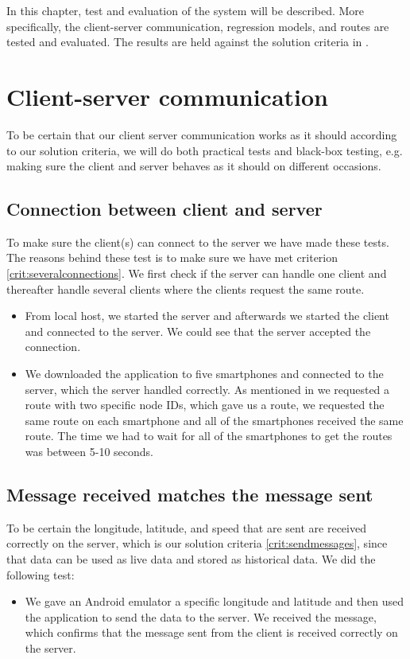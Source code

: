 In this chapter, test and evaluation of the system will be described. More specifically, the client-server communication, regression models, and routes are tested and evaluated. The results are held against the solution criteria in .

\section{Client-server communication}
To be certain that our client server communication works as it should according to our solution criteria, we will do both practical tests and black-box testing, e.g. making sure the client and server behaves as it should on different occasions.

\subsection{Connection between client and server}
To make sure the client(s) can connect to the server we have made these tests. The reasons behind these test is to make sure we have met criterion \ref{crit:severalconnections}. We first check if the server can handle one client and thereafter handle several clients where the clients request the same route. 
\begin{itemize}
	\item From local host, we started the server and afterwards we started the client and connected to the server. We could see that the server accepted the connection.
	\item We downloaded the application to five smartphones and connected to the server, which the server handled correctly. As mentioned in  we requested a route with two specific node IDs, which gave us a route, we requested the same route on each smartphone and all of the smartphones received the same route. The time we had to wait for all of the smartphones to get the routes was between 5-10 seconds.
\end{itemize}

\subsection{Message received matches the message sent}
To be certain the longitude, latitude, and speed that are sent are received correctly on the server, which is our solution criteria \ref{crit:sendmessages}, since that data can be used as live data and stored as historical data. We did the following test:
\begin{itemize}
	\item We gave an Android emulator a specific longitude and latitude and then used the application to send the data to the server. We received the message, which confirms that the message sent from the client is received correctly on the server.
\end{itemize}

